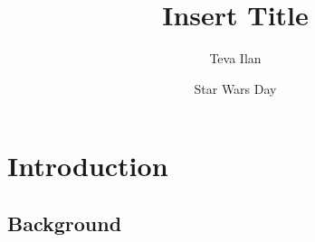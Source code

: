 \documentclass{princeton_astro_thesis}
\author{Teva Ilan}
\title{Insert Title}
\date{Star Wars Day}
\begin{document}
\chapter{Introduction}
\section{Background}

\end{document}
